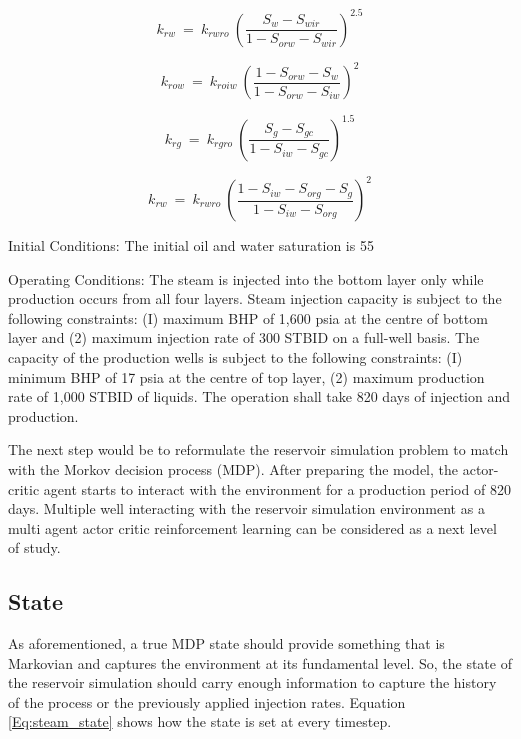 \begin{equation}\label{Eq:relatiperm1}
k_{rw}\ =\ k_{rwro}\ \left(\frac{S_w-S_{wir}}{1-S_{orw}-S_{wir}}\right)^{2.5}
\end{equation}

\begin{equation}\label{Eq:relatiperm2}
k_{row}\ =\ k_{roiw}\ \left(\frac{{1-S}_{orw}-S_w}{1-S_{orw}-S_{iw}}\right)^2		
\end{equation}

\begin{equation}\label{Eq:relatiperm3}
k_{rg}\ =\ k_{rgro}\ \left(\frac{S_g-S_{gc}}{1-S_{iw}-S_{gc}}\right)^{1.5}		    
\end{equation}

\begin{equation}\label{Eq:relatiperm4}
k_{rw}\ =\ k_{rwro}\ \left(\frac{1-S_{iw}-S_{org}-S_g}{1-S_{iw}-S_{org}}\right)^2   
\end{equation}

Initial Conditions:
The initial oil and water saturation is 55%

Operating Conditions:
The steam is injected into the bottom layer only while production occurs from all four layers. Steam injection capacity is subject to the following constraints: (I) maximum BHP of 1,600 psia at the centre of bottom layer and (2) maximum injection rate of 300 STBID on a full-well basis. The capacity of the production wells is subject to the following constraints: (I) minimum BHP of 17 psia at the centre of top layer, (2) maximum production rate of 1,000 STBID  of liquids. The operation shall take 820 days of injection and production.

The next step would be to reformulate the reservoir simulation problem to match with the Morkov decision process (MDP). After preparing the model, the actor-critic agent starts to interact with the environment for a production period of 820 days. Multiple well interacting with the reservoir simulation environment as a multi agent actor critic reinforcement learning can be considered as a next level of study. 


\subsection{State}
As aforementioned, a true MDP state should provide something that is Markovian and captures the environment at its fundamental level. So, the state of the reservoir simulation should carry enough information to capture the history of the process or the previously applied injection rates. Equation \ref{Eq:steam_state} shows how the state is set at every timestep. 

